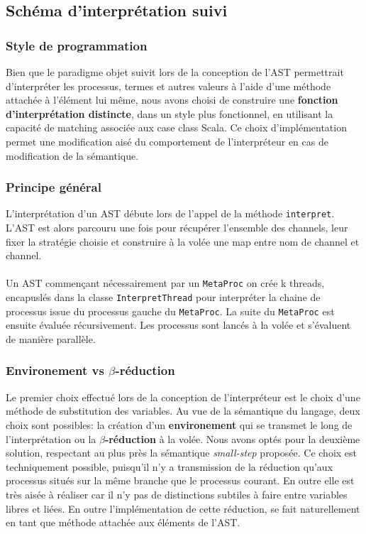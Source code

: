 \documentclass[11pt]{article} %
\begin{document}
\subsection{Schéma d'interprétation suivi}

\subsubsection{Style de programmation}
Bien que le paradigme objet suivit lors de la conception de l'AST permettrait d'interpréter les processus, termes et autres valeurs à l'aide d'une méthode attachée à l'élément lui même, nous avons choisi de construire une \textbf{fonction d'interprétation distincte}, dans un style plus fonctionnel, en utilisant la capacité de matching associée aux case class Scala. Ce choix d'implémentation permet une modification aisé du comportement de l'interpréteur en cas de modification de la sémantique.\\

\subsubsection{Principe général}
L'interprétation d'un AST débute lors de l'appel de la méthode \texttt{interpret}. L'AST est alors parcouru une fois pour récupérer l'ensemble des channels, leur fixer la stratégie choisie et construire à la volée une map entre nom de channel et channel.\\\\ Un AST commençant nécessairement par un \texttt{MetaProc} on crée k threads, encapuslés dans la classe \texttt{InterpretThread} pour interpréter la chaine de processus issue du processus gauche du \texttt{MetaProc}. La suite du \texttt{MetaProc} est ensuite évaluée récursivement. Les processus sont lancés à la volée et s'évaluent de manière parallèle.\\

\subsubsection{Environement vs $\beta$-réduction}
Le premier choix effectué lors de la conception de l'interpréteur est le choix d'une méthode de substitution des variables. Au vue de la sémantique du langage, deux choix sont possibles: la création d'un \textbf{environement} qui se transmet le long de l'interprétation ou la  \textbf{$\beta$-réduction} à la volée. Nous avons optés pour la deuxième solution, respectant au plus près la sémantique \emph{small-step} proposée.  Ce choix est techniquement possible, puisqu'il n'y a transmission de la réduction qu'aux processus situés sur la même branche que le processus courant. En outre elle est très aisée à réaliser car il n'y pas de distinctions subtiles à faire entre variables libres et liées. En outre l'implémentation de cette réduction, se fait naturellement en tant que méthode attachée aux éléments de l'AST.
\end{document}
